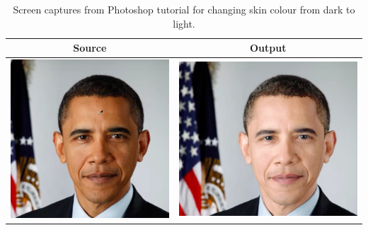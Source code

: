 \begin{table}[H]
    \centering
    \caption{Screen captures from Photoshop tutorial for changing skin colour from dark to light. \label{tab:obama_demo}}
\begin{tabular}{|c|c|}
    \hline
    Source & Output \\
    \hline
  \begin{minipage}{.29\textwidth}
    \includegraphics[width=\textwidth,height=\textheight,keepaspectratio]{images/obama_orig}
  \end{minipage} & 
  \begin{minipage}{.29\textwidth}
    \includegraphics[width=\textwidth,height=\textheight,keepaspectratio]{images/obama_res}
  \end{minipage} \\
    \hline
\end{tabular}
\end{table}

